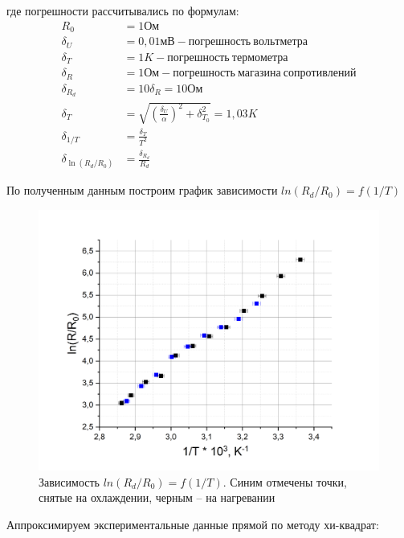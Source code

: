 \documentclass[a4paper,12pt]{article}
\begin{document}
где погрешности рассчитывались по формулам:
\begin{align*}
	R_0 &= 1 Ом \\
	\delta_U &= 0,01 мВ - погрешность \ вольтметра \\
	\delta_T &= 1 K - погрешность \ термометра\\
	\delta_R &= 1 Ом - погрешность \ магазина \ сопротивлений \\
	\delta_{R_d} &= 10 \delta_R = 10 Ом \\
	\delta_T &= \sqrt{ \left( \frac{\delta_U}{\alpha} \right)^2 + \delta_{T_0}^2} = 1,03 K \\ 
	\delta_{1/T} &= \frac{\delta_T}{T^2} \\
	\delta_{\ln (R_d/R_0)} &= \frac{\delta_{R_d}}{R_d}
\end{align*}

\newpage

По полученным данным построим график зависимости $ln(R_d/R_0) = f(1/T)$

\begin{figure}[h!]
	\centering
	\includegraphics[width=0.8\linewidth]{contact_voltage}
	\caption{Зависимость $ln(R_d/R_0) = f(1/T)$. Синим отмечены точки, снятые на охлаждении, черным -- на нагревании}
\end{figure}

Аппроксимируем экспериментальные данные прямой по методу хи-квадрат:
\end{document}
